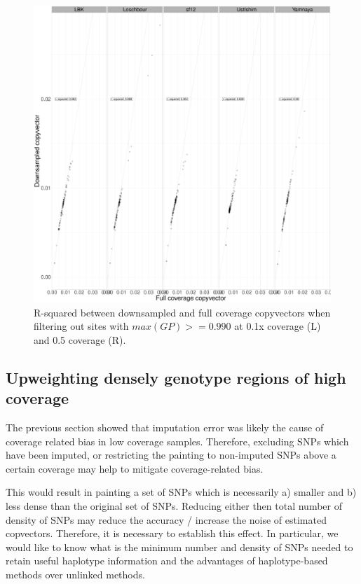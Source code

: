\begin{figure}[htp]
    \centering
    \includegraphics[width=1.0\textwidth]{../images/chapter1/CP_correlation_allSamples_0.1x_0.5x_30x.GP_filter.pdf}
    \caption{R-squared between downsampled and full coverage copyvectors when filtering out sites with $max(GP) >= 0.990$ at 0.1x coverage (L) and 0.5 coverage (R).}
    \label{fig:CP_correlation_allSamples_0.1x_0.5x_30x.GP_filter}
\end{figure}


\subsection{Upweighting densely genotype regions of high coverage}

The previous section showed that imputation error was likely the cause of coverage related bias in low coverage samples. Therefore, excluding SNPs which have been imputed, or restricting the painting to non-imputed SNPs above a certain coverage may help to mitigate coverage-related bias.

This would result in painting a set of SNPs which is necessarily a) smaller and b) less dense than the original set of SNPs. Reducing either then total number of density of SNPs may reduce the accuracy / increase the noise of estimated copvectors. Therefore, it is necessary to establish this effect. In particular, we would like to know what is the minimum number and density of SNPs needed to retain useful haplotype information and the advantages of haplotype-based methods over unlinked methods. 

